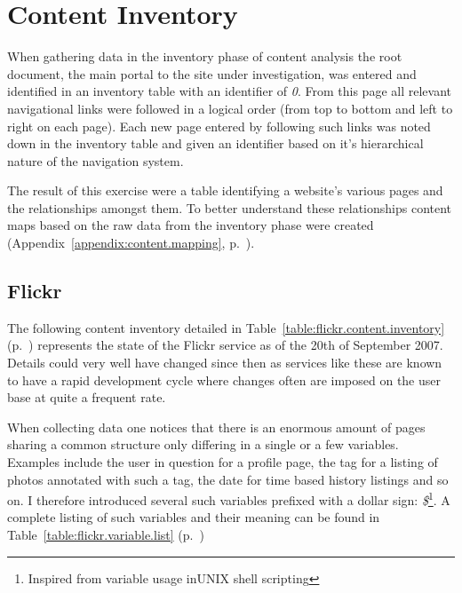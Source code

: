 \chapter{Content Inventory}

When gathering data in the inventory phase of content analysis the root
document, the main portal to the site under investigation, was entered and
identified in an inventory table with an identifier of \emph{0}. From this
page all relevant navigational links were followed in a logical order (from
top to bottom and left to right on each page). Each new page entered by
following such links was noted down in the inventory table and given an
identifier based on it's hierarchical nature of the navigation system.

The result of this exercise were a table identifying a website's various pages
and the relationships amongst them. To better understand these relationships
content maps based on the raw data from the inventory phase were created
(Appendix~\ref{appendix:content.mapping},
p.~\pageref{appendix:content.mapping}).

\label{appendix:content.inventory}

\section{Flickr}

The following content inventory detailed in
Table~\ref{table:flickr.content.inventory}
(p.~\pageref{table:flickr.content.inventory})
represents the state of the Flickr service as of the 20th of September 2007.
Details could very well have changed since then as
services like these are known to have a rapid development cycle
where changes often are imposed on the user base at quite
a frequent rate.

When collecting data one notices that there is an enormous amount of pages
sharing a common structure only differing in a single or a few variables.
Examples include the user in question for a profile page, the tag for a
listing of photos annotated with such a tag, the date for time based history
listings and so on. I therefore introduced several such variables prefixed
with a dollar sign:
\emph{\$}\footnote{Inspired from variable usage inUNIX shell scripting}.
A complete listing of such variables and their meaning can be found in
Table~\ref{table:flickr.variable.list}
(p.~\pageref{table:flickr.variable.list})

